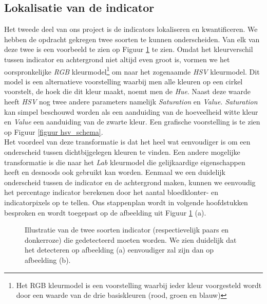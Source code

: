 \documentclass[a4paper,kulak]{kulakarticle}
\begin{document}
	\subsection{Lokalisatie van de indicator}
		Het tweede deel van ons project is de indicators lokaliseren en kwantificeren. We hebben de opdracht gekregen twee soorten te kunnen onderscheiden. Van elk van deze twee is een voorbeeld te zien op Figuur \ref{figuur indicators} te zien. Omdat het kleurverschil tussen indicator en achtergrond niet altijd even groot is, vormen we het oorspronkelijke \textit{RGB} kleurmodel\footnote{Het RGB kleurmodel is een voorstelling waarbij ieder kleur voorgesteld wordt door een waarde van de drie basiskleuren (rood, groen en blauw)} om naar het zogenaamde \textit{HSV} kleurmodel. Dit model is een alternatieve voorstelling waarbij men alle kleuren op een cirkel voorstelt, de hoek die dit kleur maakt, noemt men de \textit{Hue}. Naast deze waarde heeft \textit{HSV} nog twee andere parameters namelijk \textit{Saturation} en \textit{Value}. \textit{Saturation} kan simpel beschouwd worden als een aanduiding van de hoeveelheid witte kleur en \textit{Value} een aanduiding van de zwarte kleur. Een grafische voorstelling is te zien op Figuur \ref{figuur hsv_schema}.\\
		Het voordeel van deze transformatie is dat het heel wat eenvoudiger is om een onderscheid tussen dichtbijgelegen kleuren te vinden. Een andere mogelijke transformatie is die naar het \textit{Lab} kleurmodel die gelijkaardige eigenschappen heeft en desnoods ook gebruikt kan worden. Eenmaal we een duidelijk onderscheid tussen de indicator en de achtergrond maken, kunnen we eenvoudig het percentage indicator berekenen door het aantal bloedklonter- en indicatorpixels op te tellen. Ons stappenplan wordt in volgende hoofdstukken besproken en wordt toegepast op de afbeelding uit Figuur \ref{figuur indicators} (a).
	
	\begin{figure}[h]
		\centering
		\qquad
		
		\caption{Illustratie van de twee soorten indicator (respectievelijk paars en donkerroze) die gedetecteerd moeten worden. We zien duidelijk dat het detecteren op afbeelding (a) eenvoudiger zal zijn dan op afbeelding (b).}
		\label{figuur indicators}
	\end{figure}
\end{document}
